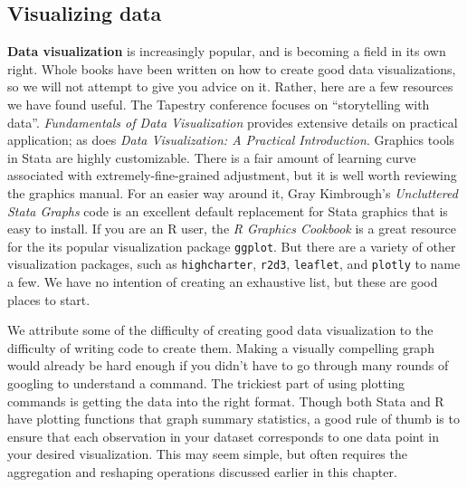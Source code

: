 \subsection{Visualizing data}

\textbf{Data visualization} 
is increasingly popular,
and is becoming a field in its own right.\cite{healy2018data,wilke2019fundamentals}
Whole books have been written on how to create good data visualizations,
so we will not attempt to give you advice on it.
Rather, here are a few resources we have found useful.
The Tapestry conference focuses on ``storytelling with data''.
\textit{Fundamentals of Data Visualization} provides extensive details on practical application;
as does \textit{Data Visualization: A Practical Introduction}.
Graphics tools in Stata are highly customizable.
There is a fair amount of learning curve associated with
extremely-fine-grained adjustment,
but it is well worth reviewing the graphics manual.
For an easier way around it, Gray Kimbrough's
\textit{Uncluttered Stata Graphs}
code is an excellent default replacement for Stata graphics
that is easy to install.
If you are an R user, the \textit{R Graphics Cookbook}
is a great resource for the its popular visualization package \texttt{ggplot}.
But there are a variety of other visualization packages,
such as \texttt{highcharter}, \texttt{r2d3}, \texttt{leaflet},
and \texttt{plotly} to name a few. 
We have no intention of creating an exhaustive list,
but these are good places to start.

We attribute some of the difficulty of creating good data visualization
to the difficulty of writing code to create them.
Making a visually compelling graph would already be hard enough if
you didn't have to go through many rounds of googling to understand a command.
The trickiest part of using plotting commands is getting the data into the right format.
Though both Stata and R have plotting functions that graph summary statistics,
a good rule of thumb is to ensure that each
observation in your dataset corresponds to one data point in your desired visualization.
This may seem simple,
but often requires the aggregation and reshaping operations
discussed earlier in this chapter.

